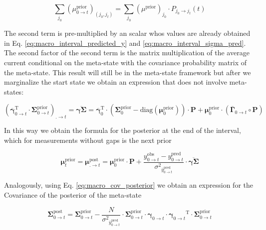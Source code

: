 \documentclass[pdflatex,sn-mathphys-num]{sn-jnl}%
\theoremstyle{thmstyleone}%
\theoremstyle{thmstyletwo}%
\theoremstyle{thmstylethree}%
\begin{document}
\begin{equation}
	\sum_{j_0} (\mu^{\mathrm{prior}}_{0 \rightarrow t})_{(j_0, j_{t})}= \sum_{j_0} (\mu^{\text{prior}})_{j_0} \cdot P_{j_0 \rightarrow j_t}(t)
	\label{eq:mu_prior_update_0_to_t}
\end{equation}

The second term is pre-multiplied by an scalar whos values are already obtained in Eq. \ref{eq:macro_interval_predicted_y} and \ref{eq:macro_interval_sigma_pred}. The second factor of the second term is the matrix multiplication of the average current conditional on the meta-state with the covariance probability matrix of the meta-state. 
This result will still be in the meta-state framework but after we marginalize the start state we obtain an expression that does not involve meta-states: 

\begin{equation}
	\left(\overline{\boldsymbol{\gamma}}^{\mathrm{T}}_{0 \rightarrow t} \cdot \boldsymbol{\Sigma}^{\mathrm{prior}}_{0 \rightarrow t} \right)_{. \rightarrow t} =\overline{\boldsymbol{\gamma} \boldsymbol{\Sigma}}= 
	\overline{\boldsymbol{\gamma}}_{0}^{\mathrm{T}} \cdot 
	\left( \boldsymbol{\Sigma}^{\mathrm{prior}}_{0} - \mathrm{diag}(\boldsymbol{\mu}^{\mathrm{prior}}_0) \right) \cdot \boldsymbol{P} 
	+ \boldsymbol{\mu}^{\mathrm{prior}}_0 \cdot \left( \overline{\boldsymbol{\Gamma}}_{0 \rightarrow t} \circ \boldsymbol{P} \right)
	\label{eq:interval_gamma_sigma}
\end{equation}

In this way we obtain the formula for the posterior at the end of the interval, which for measurements without gaps is the next prior


\begin{equation}
	\boldsymbol{\mu}^{\mathrm{prior}}_{t} = \boldsymbol{\mu}^{\mathrm{post}}_{. \rightarrow t} = \boldsymbol{\mu}^{\mathrm{prior}}_0 \cdot \boldsymbol{P} + 
	\frac{y^{\mathrm{obs}}_{0 \rightarrow t} - y^{\mathrm{pred}}_{0 \rightarrow t}}{{\sigma^2}_{\overline{y}^{\mathrm{pred}}_{0 \rightarrow t}}} 
	\cdot \overline{\boldsymbol{\gamma} \boldsymbol{\Sigma}}
	\label{eq:macro_interval_posterior_mean}
\end{equation}

Analogously, using Eq. \ref{eq:macro_cov_posterior} we obtain an expression for the Covariance of the posterior of the meta-state


\begin{equation}
	\boldsymbol{\Sigma}^{\mathrm{post}}_{0 \rightarrow t} = \boldsymbol{\Sigma}^{\mathrm{prior}}_{0 \rightarrow t} - 
	\frac{N}{{\sigma^2}_{\overline{y}^{\mathrm{pred}}_{0 \rightarrow t}}} \cdot \boldsymbol{\Sigma}^{\mathrm{prior}}_{0 \rightarrow t} \cdot \boldsymbol{\gamma}_{0 \rightarrow t} \cdot 
	{\boldsymbol{\gamma}_{0 \rightarrow t}}^{\mathrm{T}} \cdot \boldsymbol{\Sigma}^{\mathrm{prior}}_{0 \rightarrow t}
	\label{eq:posterior_covariance_update_0_t}
\end{equation}
\end{document}
